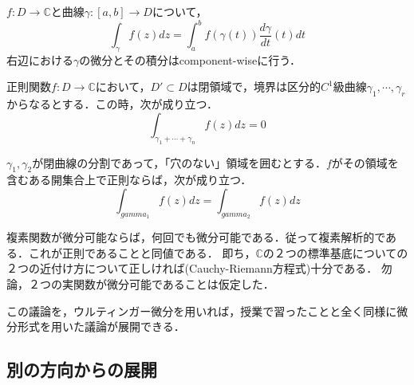 \documentclass[uplatex, dvipdfmx]{jsreport}
\begin{document}
\begin{definition}[複素線積分]
    $f:D\to\mathbb{C}$と曲線$\gamma:[a,b]\to D$について，
    \[ \int_\gamma f(z)dz = \int^b_af(\gamma (t))\frac{d\gamma}{dt}(t)dt \]
    右辺における$\gamma$の微分とその積分はcomponent-wiseに行う．
\end{definition}
\begin{theorem}[Cauchyの積分定理]
    正則関数$f:D\to\mathbb{C}$において，$D'\subset D$は閉領域で，境界は区分的$C^1$級曲線$\gamma_1,\cdots,\gamma_r$からなるとする．この時，次が成り立つ．
    \[ \int_{\gamma_1+\cdots+\gamma_n}f(z)dz = 0 \]
\end{theorem}
\begin{corollary}
    $\gamma_1,\gamma_2$が閉曲線の分割であって，「穴のない」領域を囲むとする．$f$がその領域を含むある開集合上で正則ならば，次が成り立つ．
    \[ \int_{gamma_1}f(z)dz = \int_{gamma_2}f(z)dz \]
\end{corollary}

\begin{screen}
    複素関数が微分可能ならば，何回でも微分可能である．従って複素解析的である．これが正則であることと同値である．
    即ち，$\mathbb{C}$の２つの標準基底についての２つの近付け方について正しければ(Cauchy-Riemann方程式)十分である．
    勿論，２つの実関数が微分可能であることは仮定した．

    この議論を，ウルティンガー微分を用いれば，授業で習ったことと全く同様に微分形式を用いた議論が展開できる．
\end{screen}

\subsection{別の方向からの展開}
\end{document}
